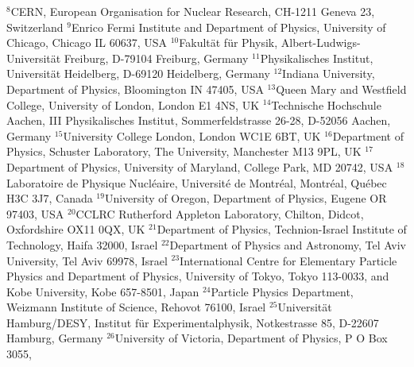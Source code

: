 \documentclass[12pt,a4paper,twoside]{article}
\begin{document}
$^{  8}$CERN, European Organisation for Nuclear Research,
CH-1211 Geneva 23, Switzerland
\newline
$^{  9}$Enrico Fermi Institute and Department of Physics,
University of Chicago, Chicago IL 60637, USA
\newline
$^{ 10}$Fakult\"at f\"ur Physik, Albert-Ludwigs-Universit\"at
Freiburg, D-79104 Freiburg, Germany
\newline
$^{ 11}$Physikalisches Institut, Universit\"at
Heidelberg, D-69120 Heidelberg, Germany
\newline
$^{ 12}$Indiana University, Department of Physics,
Bloomington IN 47405, USA
\newline
$^{ 13}$Queen Mary and Westfield College, University of London,
London E1 4NS, UK
\newline
$^{ 14}$Technische Hochschule Aachen, III Physikalisches Institut,
Sommerfeldstrasse 26-28, D-52056 Aachen, Germany
\newline
$^{ 15}$University College London, London WC1E 6BT, UK
\newline
$^{ 16}$Department of Physics, Schuster Laboratory, The University,
Manchester M13 9PL, UK
\newline
$^{ 17}$Department of Physics, University of Maryland,
College Park, MD 20742, USA
\newline
$^{ 18}$Laboratoire de Physique Nucl\'eaire, Universit\'e de Montr\'eal,
Montr\'eal, Qu\'ebec H3C 3J7, Canada
\newline
$^{ 19}$University of Oregon, Department of Physics, Eugene
OR 97403, USA
\newline
$^{ 20}$CCLRC Rutherford Appleton Laboratory, Chilton,
Didcot, Oxfordshire OX11 0QX, UK
\newline
$^{ 21}$Department of Physics, Technion-Israel Institute of
Technology, Haifa 32000, Israel
\newline
$^{ 22}$Department of Physics and Astronomy, Tel Aviv University,
Tel Aviv 69978, Israel
\newline
$^{ 23}$International Centre for Elementary Particle Physics and
Department of Physics, University of Tokyo, Tokyo 113-0033, and
Kobe University, Kobe 657-8501, Japan
\newline
$^{ 24}$Particle Physics Department, Weizmann Institute of Science,
Rehovot 76100, Israel
\newline
$^{ 25}$Universit\"at Hamburg/DESY, Institut f\"ur Experimentalphysik,
Notkestrasse 85, D-22607 Hamburg, Germany
\newline
$^{ 26}$University of Victoria, Department of Physics, P O Box 3055,
\end{document}
